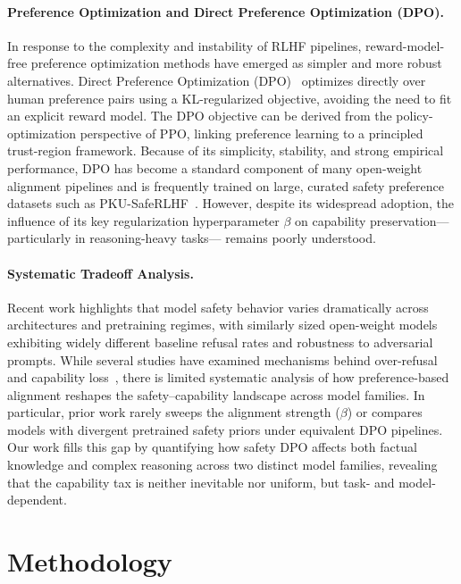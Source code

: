 \documentclass[a4paper, twocolumn, 9pt]{article}
\begin{document}
\paragraph{Preference Optimization and Direct Preference Optimization (DPO).}
In response to the complexity and instability of RLHF pipelines, reward-model-free
preference optimization methods have emerged as simpler and more robust alternatives.
Direct Preference Optimization (DPO)~\cite{dpo} optimizes directly over human preference
pairs using a KL-regularized objective, avoiding the need to fit an explicit reward
model. The DPO objective can be derived from the policy-optimization perspective of PPO,
linking preference learning to a principled trust-region framework. Because of its
simplicity, stability, and strong empirical performance, DPO has become a standard
component of many open-weight alignment pipelines and is frequently trained on large,
curated safety preference datasets such as PKU-SafeRLHF~\cite{pku-saferlhf}.
However, despite its widespread adoption, the influence of its key regularization
hyperparameter $\beta$ on capability preservation---particularly in reasoning-heavy tasks---
remains poorly understood.

\paragraph{Systematic Tradeoff Analysis.}
Recent work highlights that model safety behavior varies dramatically across architectures
and pretraining regimes, with similarly sized open-weight models exhibiting widely
different baseline refusal rates and robustness to adversarial prompts.
While several studies have examined mechanisms behind over-refusal and capability loss~\cite{llm-overrefusal},
there is limited systematic analysis of how preference-based alignment reshapes the
safety--capability landscape across model families.
In particular, prior work rarely sweeps the alignment strength ($\beta$) or compares
models with divergent pretrained safety priors under equivalent DPO pipelines.
Our work fills this gap by quantifying how safety DPO affects both factual knowledge
and complex reasoning across two distinct model families, revealing that the capability
tax is neither inevitable nor uniform, but task- and model-dependent.


\section{Methodology}
\label{sec:method}
\end{document}
